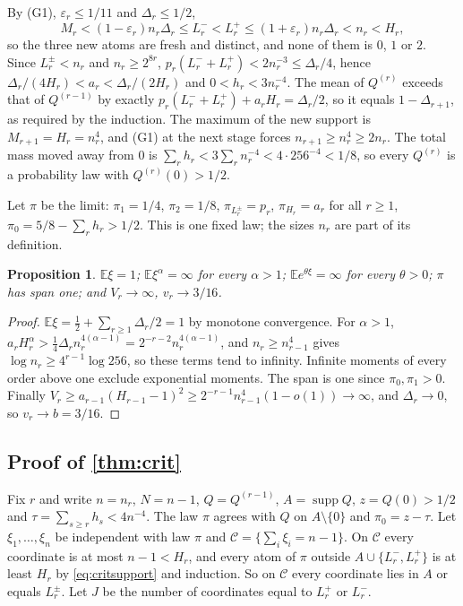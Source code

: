 \documentclass[11pt]{amsart}
\newtheorem{proposition}[theorem]{Proposition}
\theoremstyle{definition}
\newcommand{\E}{\mathbb{E}}
\newcommand{\Cond}{\mathcal{C}}
\DeclareMathOperator{\supp}{supp}
\begin{document}
By (G1), $\varepsilon_r\le1/11$ and $\Delta_r\le1/2$,
\begin{equation}\label{eq:critsupport}
M_r<(1-\varepsilon_r)n_r\Delta_r\le L_r^-<L_r^+\le(1+\varepsilon_r)n_r\Delta_r<n_r<H_r,
\end{equation}
so the three new atoms are fresh and distinct, and none of them is $0$, $1$ or $2$. Since $L_r^\pm<n_r$ and $n_r\ge2^{8r}$, $p_r(L_r^-+L_r^+)<2n_r^{-3}\le\Delta_r/4$, hence $\Delta_r/(4H_r)<a_r<\Delta_r/(2H_r)$ and $0<h_r<3n_r^{-4}$. The mean of $Q^{(r)}$ exceeds that of $Q^{(r-1)}$ by exactly $p_r(L_r^-+L_r^+)+a_rH_r=\Delta_r/2$, so it equals $1-\Delta_{r+1}$, as required by the induction. The maximum of the new support is $M_{r+1}=H_r=n_r^4$, and (G1) at the next stage forces $n_{r+1}\ge n_r^4\ge2n_r$. The total mass moved away from $0$ is $\sum_rh_r<3\sum_rn_r^{-4}<4\cdot256^{-4}<1/8$, so every $Q^{(r)}$ is a probability law with $Q^{(r)}(0)>1/2$.

Let $\pi$ be the limit: $\pi_1=1/4$, $\pi_2=1/8$, $\pi_{L_r^\pm}=p_r$, $\pi_{H_r}=a_r$ for all $r\ge1$, $\pi_0=5/8-\sum_rh_r>1/2$. This is one fixed law; the sizes $n_r$ are part of its definition.

\begin{proposition}\label{prop:crit}
$\E\xi=1$; $\E\xi^\alpha=\infty$ for every $\alpha>1$; $\E e^{\theta\xi}=\infty$ for every $\theta>0$; $\pi$ has span one; and $V_r\to\infty$, $v_r\to3/16$.
\end{proposition}

\begin{proof}
$\E\xi=\tfrac12+\sum_{r\ge1}\Delta_r/2=1$ by monotone convergence. For $\alpha>1$, $a_rH_r^\alpha>\tfrac14\Delta_rn_r^{4(\alpha-1)}=2^{-r-2}n_r^{4(\alpha-1)}$, and $n_r\ge n_{r-1}^4$ gives $\log n_r\ge4^{r-1}\log256$, so these terms tend to infinity. Infinite moments of every order above one exclude exponential moments. The span is one since $\pi_0,\pi_1>0$. Finally $V_r\ge a_{r-1}(H_{r-1}-1)^2\ge2^{-r-1}n_{r-1}^{4}(1-o(1))\to\infty$, and $\Delta_r\to0$, so $v_r\to b=3/16$.
\end{proof}

\subsection{Proof of \cref{thm:crit}}

Fix $r$ and write $n=n_r$, $N=n-1$, $Q=Q^{(r-1)}$, $A=\supp Q$, $z=Q(0)>1/2$ and $\tau=\sum_{s\ge r}h_s<4n^{-4}$. The law $\pi$ agrees with $Q$ on $A\setminus\{0\}$ and $\pi_0=z-\tau$. Let $\xi_1,\dots,\xi_n$ be independent with law $\pi$ and $\Cond=\{\sum_i\xi_i=n-1\}$. On $\Cond$ every coordinate is at most $n-1<H_r$, and every atom of $\pi$ outside $A\cup\{L_r^-,L_r^+\}$ is at least $H_r$ by \eqref{eq:critsupport} and induction. So on $\Cond$ every coordinate lies in $A$ or equals $L_r^\pm$. Let $J$ be the number of coordinates equal to $L_r^+$ or $L_r^-$.
\end{document}
